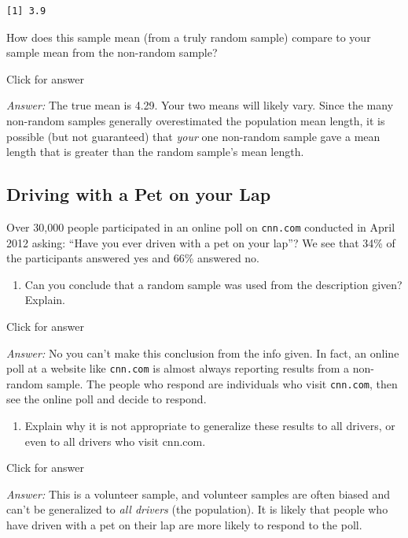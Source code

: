 \documentclass[
]{book}
\providecommand{\tightlist}{%
  \setlength{\itemsep}{0pt}\setlength{\parskip}{0pt}}
\begin{document}
\begin{verbatim}
[1] 3.9
\end{verbatim}

How does this sample mean (from a truly random sample) compare to your sample mean from the non-random sample?

Click for answer

\emph{Answer:} The true mean is 4.29. Your two means will likely vary. Since the many non-random samples generally overestimated the population mean length, it is possible (but not guaranteed) that \emph{your} one non-random sample gave a mean length that is greater than the random sample's mean length.

\hypertarget{driving-with-a-pet-on-your-lap}{%
\subsection{Driving with a Pet on your Lap}\label{driving-with-a-pet-on-your-lap}}

Over 30,000 people participated in an online poll on \texttt{cnn.com} conducted in April 2012 asking: ``Have you ever driven with a pet on your lap''? We see that 34\% of the participants answered yes and 66\% answered no.

\begin{enumerate}
\def\labelenumi{\alph{enumi}.}
\tightlist
\item
  Can you conclude that a random sample was used from the description given? Explain.
\end{enumerate}

Click for answer

\emph{Answer:} No you can't make this conclusion from the info given. In fact, an online poll at a website like \texttt{cnn.com} is almost always reporting results from a non-random sample. The people who respond are individuals who visit \texttt{cnn.com}, then see the online poll and decide to respond.

\begin{enumerate}
\def\labelenumi{\alph{enumi}.}
\setcounter{enumi}{1}
\tightlist
\item
  Explain why it is not appropriate to generalize these results to all drivers, or even to all drivers who visit cnn.com.
\end{enumerate}

Click for answer

\emph{Answer:} This is a volunteer sample, and volunteer samples are often biased and can't be generalized to \emph{all drivers} (the population). It is likely that people who have driven with a pet on their lap are more likely to respond to the poll.
\end{document}
